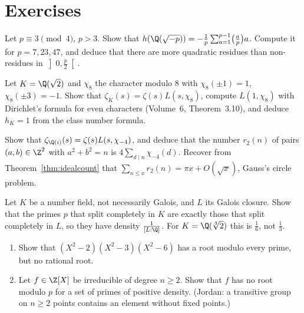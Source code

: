 \section{Exercises}

\begin{exercise}[$\star$]\label{ex:hminusp}
Let $p\equiv3\pmod4$, $p>3$. Show that $h(\Q(\sqrt{-p}))=-\frac1p\sum_{a=1}^{p-1}\bigl(\frac ap\bigr)a$. Compute it for $p=7,23,47$, and deduce that
there are more quadratic residues than non-residues in $\left]0,\frac p2\right[$.
\end{exercise}

\begin{exercise}[$\star\star$]\label{ex:sqrt2}
Let $K=\Q(\sqrt2)$ and $\chi_8$ the character modulo $8$ with $\chi_8(\pm1)=1$, $\chi_8(\pm3)=-1$. Show that $\zeta_K(s)=\zeta(s)L(s,\chi_8)$, compute
$L(1,\chi_8)$ with Dirichlet's formula for even characters (Volume~6, Theorem~3.10), and deduce $h_K=1$ from the class number formula.
\end{exercise}

\begin{exercise}[$\star\star$]\label{ex:twosq}
Show that $\zeta_{\Q(i)}(s)=\zeta(s)L(s,\chi_{-4})$, and deduce that the number $r_2(n)$ of pairs $(a,b)\in\Z^2$ with $a^2+b^2=n$ is
$4\sum_{d\mid n}\chi_{-4}(d)$. Recover from Theorem~\ref{thm:idealcount} that $\sum_{n\le x}r_2(n)=\pi x+O(\sqrt x)$, Gauss's circle problem.
\end{exercise}

\begin{exercise}[$\star\star$]\label{ex:splitdensity}
Let $K$ be a number field, not necessarily Galois, and $L$ its Galois closure. Show that the primes $p$ that split completely in $K$ are exactly those
that split completely in $L$, so they have density $\frac1{[L:\Q]}$. For $K=\Q(\sqrt[3]2)$ this is $\frac16$, not $\frac13$.
\end{exercise}

\begin{exercise}[$\star\star$]\label{ex:rootevery}
\begin{enumerate}[label=(\alph*)]
\item Show that $(X^2-2)(X^2-3)(X^2-6)$ has a root modulo every prime, but no rational root.
\item Let $f\in\Z[X]$ be irreducible of degree $n\ge2$. Show that $f$ has no root modulo $p$ for a set of primes of positive density. (Jordan: a
transitive group on $n\ge2$ points contains an element without fixed points.)
\end{enumerate}
\end{exercise}


